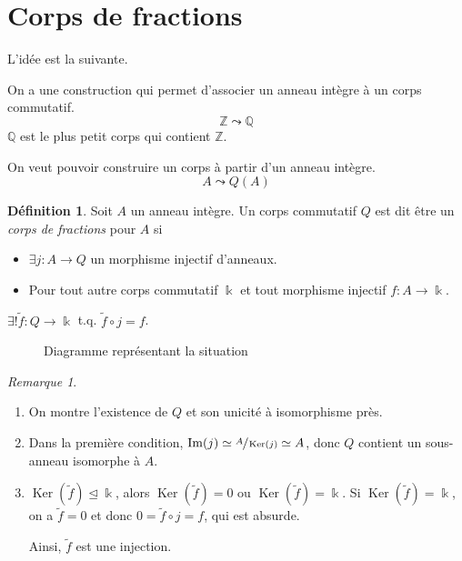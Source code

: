 \documentclass{report}
\theoremstyle{definition}
\newtheorem*{dfn}{D\'efinition}
\theoremstyle{remark}
\newtheorem*{rmq}{Remarque}
\def\ZZ{\mathbb{Z}}
\def\QQ{\mathbb{Q}}
\def\im{\operatorname{Im}}
\def\noyau{\operatorname{Ker}}
\begin{document}
	\section{Corps de fractions}
	L'id\'ee est la suivante.

	On a une construction qui permet d'associer un anneau int\`egre \`a un corps commutatif.
	\[ \ZZ \leadsto \QQ \]
	$\QQ$ est le plus petit corps qui contient $\ZZ$.

	On veut pouvoir construire un corps \`a partir d'un anneau int\`egre.
	\[ A \leadsto Q(A) \]

	\begin{dfn}
		Soit $A$ un anneau int\`egre. Un corps commutatif $Q$ est dit \^etre un \emph{corps de fractions} pour $A$ si
		\begin{itemize}
			\item $\exists j:A\to Q$ un morphisme injectif d'anneaux.
			\item Pour tout autre corps commutatif $\Bbbk$ et tout morphisme injectif $f:A\to\Bbbk$.
		\end{itemize}

		$\exists!\widetilde{f}:Q\to\Bbbk$ t.q. $\widetilde{f}\circ j=f$.
		\begin{figure}[h]
			\centering
			\caption{Diagramme repr\'esentant la situation}
		\end{figure}
	\end{dfn}

	\begin{rmq}
		\begin{enumerate}
			\item On montre l'existence de $Q$ et son unicit\'e \`a isomorphisme pr\`es.
			\item Dans la premi\`ere condition, $\im(j) \simeq \sfrac{A}{\noyau(j)} \simeq A$, donc $Q$ contient un sous-anneau isomorphe \`a $A$.
			\item $\noyau(\widetilde{f}) \trianglelefteq \Bbbk$, alors $\noyau(\widetilde{f})=0$ ou $\noyau(\widetilde{f})=\Bbbk$. Si $\noyau(\widetilde{f})=\Bbbk$, on a $\widetilde{f}=0$ et donc $0=\widetilde{f}\circ j=f$, qui est absurde.

			Ainsi, $\widetilde{f}$ est une injection.
		\end{enumerate}
	\end{rmq}
\end{document}
